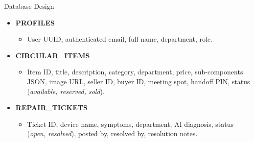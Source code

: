 \documentclass{beamer}
\begin{document}
\begin{frame}{Database Design}

\begin{itemize}
    \setlength\itemsep{0.35cm}
    \item \textbf{PROFILES}
    \begin{itemize}
        \item User UUID, authenticated email, full name, department, role.
    \end{itemize}

    \item \textbf{CIRCULAR\_ITEMS}
    \begin{itemize}
        \item Item ID, title, description, category, department, price, sub-components JSON, image URL, seller ID, buyer ID, meeting spot, handoff PIN, status (\textit{available, reserved, sold}).
    \end{itemize}

    \item \textbf{REPAIR\_TICKETS}
    \begin{itemize}
        \item Ticket ID, device name, symptoms, department, AI diagnosis, status (\textit{open, resolved}), posted by, resolved by, resolution notes.
    \end{itemize}
\end{itemize}

\end{frame}

\end{document}
